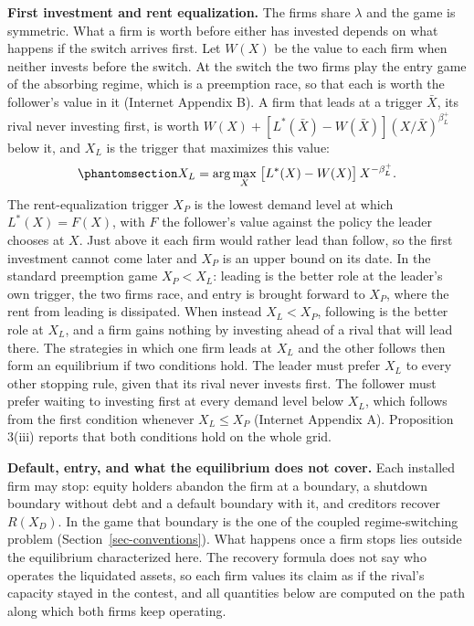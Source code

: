 \documentclass[
  11pt,
  letterpaper,
]{scrartcl}
\begin{document}
\textbf{First investment and rent equalization.} The firms share
\(\lambda\) and the game is symmetric. What a firm is worth before
either has invested depends on what happens if the switch arrives first.
Let \(W(X)\) be the value to each firm when neither invests before the
switch. At the switch the two firms play the entry game of the absorbing
regime, which is a preemption race, so that each is worth the follower's
value in it (Internet Appendix B). A firm that leads at a trigger
\(\bar{X}\), its rival never investing first, is worth
\(W(X) + [L^*(\bar{X}) - W(\bar{X})](X/\bar{X})^{\beta_L^+}\) below it,
and \(X_L\) is the trigger that maximizes this value:
\begin{equation}\protect\phantomsection\label{eq-first-investment}{
X_L = \arg\max_{X}\; \bigl[L^*(X) - W(X)\bigr]\,X^{-\beta_L^+}.
}\end{equation} The rent-equalization trigger \(X_P\) is the lowest
demand level at which \(L^*(X) = F(X)\), with \(F\) the follower's value
against the policy the leader chooses at \(X\). Just above it each firm
would rather lead than follow, so the first investment cannot come later
and \(X_P\) is an upper bound on its date. In the standard preemption
game \(X_P < X_L\): leading is the better role at the leader's own
trigger, the two firms race, and entry is brought forward to \(X_P\),
where the rent from leading is dissipated. When instead \(X_L < X_P\),
following is the better role at \(X_L\), and a firm gains nothing by
investing ahead of a rival that will lead there. The strategies in which
one firm leads at \(X_L\) and the other follows then form an equilibrium
if two conditions hold. The leader must prefer \(X_L\) to every other
stopping rule, given that its rival never invests first. The follower
must prefer waiting to investing first at every demand level below
\(X_L\), which follows from the first condition whenever
\(X_L \leq X_P\) (Internet Appendix A). Proposition 3(iii) reports that
both conditions hold on the whole grid.

\textbf{Default, entry, and what the equilibrium does not cover.} Each
installed firm may stop: equity holders abandon the firm at a boundary,
a shutdown boundary without debt and a default boundary with it, and
creditors recover \(R(X_D)\). In the game that boundary is the one of
the coupled regime-switching problem (Section~\ref{sec-conventions}).
What happens once a firm stops lies outside the equilibrium
characterized here. The recovery formula does not say who operates the
liquidated assets, so each firm values its claim as if the rival's
capacity stayed in the contest, and all quantities below are computed on
the path along which both firms keep operating.
\end{document}
